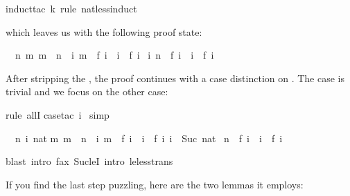 \begin{isabellebody}
induct{\isacharunderscore}tac\ k\ rule{\isacharcolon}\ nat{\isacharunderscore}less{\isacharunderscore}induct{\isacharparenright}%
\begin{isamarkuptxt}%
\noindent
which leaves us with the following proof state:
\begin{isabelle}%
\ {}{\isachardot}\ {\isasymAnd}n{\isachardot}\ {\isasymforall}m{\isachardot}\ m\ {\isacharless}\ n\ {\isasymlongrightarrow}\ {\isacharparenleft}{\isasymforall}i{\isachardot}\ m\ {\isacharequal}\ f\ i\ {\isasymlongrightarrow}\ i\ {\isasymle}\ f\ i{\isacharparenright}\ {\isasymLongrightarrow}\isanewline
{}i{\isachardot}\ n\ {\isacharequal}\ f\ i\ {\isasymlongrightarrow}\ i\ {\isasymle}\ f\ i%
\end{isabelle}
After stripping the , the proof continues with a case
distinction on . The case  is trivial and we focus on
the other case:%
\end{isamarkuptxt}%
rule\ allI{\isacharparenright}\isanewline
{}case{\isacharunderscore}tac\ i{\isacharparenright}\isanewline
\ simp{\isacharparenright}%
\begin{isamarkuptxt}%
\begin{isabelle}%
\ {}{\isachardot}\ {\isasymAnd}n\ i\ nat{\isachardot}\isanewline
{}m{\isachardot}\ m\ {\isacharless}\ n\ {\isasymlongrightarrow}\ {\isacharparenleft}{\isasymforall}i{\isachardot}\ m\ {\isacharequal}\ f\ i\ {\isasymlongrightarrow}\ i\ {\isasymle}\ f\ i{\isacharparenright}{\isacharsemicolon}\ i\ {\isacharequal}\ Suc\ nat{\isasymrbrakk}\isanewline
{}\ n\ {\isacharequal}\ f\ i\ {\isasymlongrightarrow}\ i\ {\isasymle}\ f\ i%
\end{isabelle}%
\end{isamarkuptxt}%
blast\ intro{\isacharbang}{\isacharcolon}\ f{\isacharunderscore}ax\ Suc{\isacharunderscore}leI\ intro{\isacharcolon}\ le{\isacharunderscore}less{\isacharunderscore}trans{\isacharparenright}%
\begin{isamarkuptext}%
\noindent
If you find the last step puzzling, here are the two lemmas it employs:
\begin{isabelle}

\end{isabelle}
\end{isamarkuptext}
\end{isabellebody}
